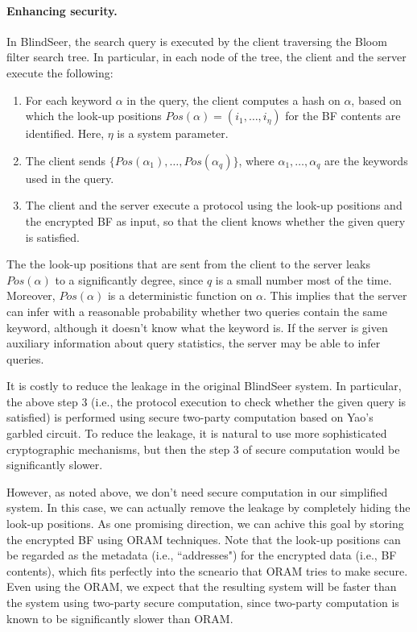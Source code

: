 \paragraph{Enhancing security.}
In BlindSeer, the search query is executed by the client traversing the Bloom filter
search tree. In particular, in each node of the tree, the client and the server
execute the following:
\begin{enumerate}\setlength\itemsep{0em}
\item For each keyword $\alpha$ in the query, the client computes a hash on
  $\alpha$, based on which the look-up positions $Pos(\alpha) = (i_1, \ldots,
    i_\eta)$ for the BF contents are identified. Here, $\eta$ is a system
    parameter. 

\item The client sends $\{Pos(\alpha_1), \ldots, Pos(\alpha_q)\}$,
  where $\alpha_1,\ldots,\alpha_q$ are the keywords used in the query.

\item The client and the server execute a protocol using the look-up positions
  and the encrypted BF as input, so that the client knows whether the given
query is satisfied. 
\end{enumerate}

The the look-up positions that are sent from the client to the server leaks
$Pos(\alpha)$ to a significantly degree, since $q$ is a small number most of
the time. Moreover, $Pos(\alpha)$ is a deterministic function on $\alpha$.
This implies that the server can infer with a reasonable probability whether
two queries contain the same keyword, although it doesn't know what the keyword
is.  If the server is given  auxiliary information about query statistics, the
server may be able to infer queries. 


It is costly to reduce the leakage in the original BlindSeer system. In
particular, the above step 3 (i.e., the protocol execution to check whether the
given query is satisfied) is performed using secure two-party computation based
on Yao's garbled circuit. To reduce the leakage, it is natural to use more
sophisticated cryptographic mechanisms, but then the step 3 of secure
computation would be significantly slower. 

However, as noted above, we don't need secure computation in our simplified
system. In this case, we can actually remove the leakage by completely hiding
the look-up positions. As one promising direction, we can achive this goal by
storing the encrypted BF using ORAM techniques. Note that the look-up positions
can be regarded as the metadata (i.e., ``addresses") for the encrypted data
(i.e., BF contents), which fits perfectly into the scneario that ORAM tries to
make secure. 
%
Even using the ORAM, we expect that the resulting system will be faster than
the system using two-party secure computation, since two-party computation is
known to be significantly slower than ORAM. 

